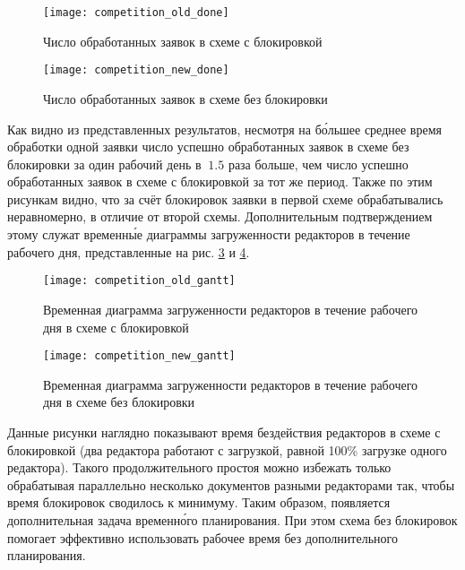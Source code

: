 \begin{figure}[h!]
  \centering
  \texttt{[image: competition\_old\_done]}
  \caption{Число обработанных заявок в схеме с блокировкой}
  \label{img:competition_old_done}
\end{figure}

\begin{figure}[h!]
  \centering
  \texttt{[image: competition\_new\_done]}
  \caption{Число обработанных заявок в схеме без блокировки}
  \label{img:competition_new_done}
\end{figure}

\vspace{\baselineskip}
Как видно из представленных результатов, несмотря на б\'{о}льшее среднее время обработки одной заявки число успешно обработанных заявок в схеме без блокировки за один рабочий день в $~1.5$ раза больше, чем число успешно обработанных заявок в схеме с блокировкой за тот же период. Также по этим рисункам видно, что за счёт блокировок заявки в первой схеме обрабатывались неравномерно, в отличие от второй схемы. Дополнительным подтверждением этому служат временн\'{ы}е диаграммы загруженности редакторов в течение рабочего дня, представленные на рис. \ref{img:competition_old_gantt} и \ref{img:competition_new_gantt}.

\begin{figure}[h!]
  \centering
  \texttt{[image: competition\_old\_gantt]}
  \caption{Временная диаграмма загруженности редакторов в течение рабочего дня в схеме с блокировкой}
  \label{img:competition_old_gantt}
\end{figure}

\begin{figure}[h!]
  \centering
  \texttt{[image: competition\_new\_gantt]}
  \caption{Временная диаграмма загруженности редакторов в течение рабочего дня в схеме без блокировки}
  \label{img:competition_new_gantt}
\end{figure}

\vspace{\baselineskip}
Данные рисунки наглядно показывают время бездействия редакторов в схеме с блокировкой (два редактора работают с загрузкой, равной 100\% загрузке одного редактора). Такого продолжительного простоя можно избежать только обрабатывая параллельно несколько документов разными редакторами так, чтобы время блокировок сводилось к минимуму. Таким образом, появляется дополнительная задача временн\'{о}го планирования. При этом схема без блокировок помогает эффективно использовать рабочее время без дополнительного планирования.

